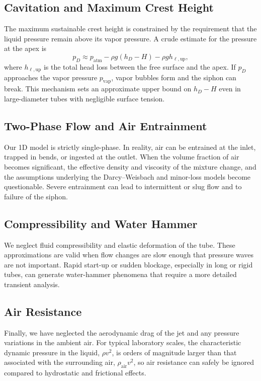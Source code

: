 \documentclass[11pt]{article}
\begin{document}
\subsection{Cavitation and Maximum Crest Height}

The maximum sustainable crest height is constrained by the requirement that the liquid pressure remain above its vapor pressure.
A crude estimate for the pressure at the apex is
\begin{equation}
  p_D \approx p_{\text{atm}} - \rho g (h_D - H) - \rho g h_{\ell,\text{up}},
\end{equation}
where $h_{\ell,\text{up}}$ is the total head loss between the free surface and the apex.
If $p_D$ approaches the vapor pressure $p_{\text{vap}}$, vapor bubbles form and the siphon can break.
This mechanism sets an approximate upper bound on $h_D - H$ even in large-diameter tubes with negligible surface tension.

\subsection{Two-Phase Flow and Air Entrainment}

Our 1D model is strictly single-phase.
In reality, air can be entrained at the inlet, trapped in bends, or ingested at the outlet.
When the volume fraction of air becomes significant, the effective density and viscosity of the mixture change, and the assumptions underlying the Darcy--Weisbach and minor-loss models become questionable.
Severe entrainment can lead to intermittent or slug flow and to failure of the siphon.

\subsection{Compressibility and Water Hammer}

We neglect fluid compressibility and elastic deformation of the tube.
These approximations are valid when flow changes are slow enough that pressure waves are not important.
Rapid start-up or sudden blockage, especially in long or rigid tubes, can generate water-hammer phenomena that require a more detailed transient analysis.

\subsection{Air Resistance}

Finally, we have neglected the aerodynamic drag of the jet and any pressure variations in the ambient air.
For typical laboratory scales, the characteristic dynamic pressure in the liquid, $\rho v^2$, is orders of magnitude larger than that associated with the surrounding air, $\rho_{\text{air}} v^2$, so air resistance can safely be ignored compared to hydrostatic and frictional effects.
\end{document}
